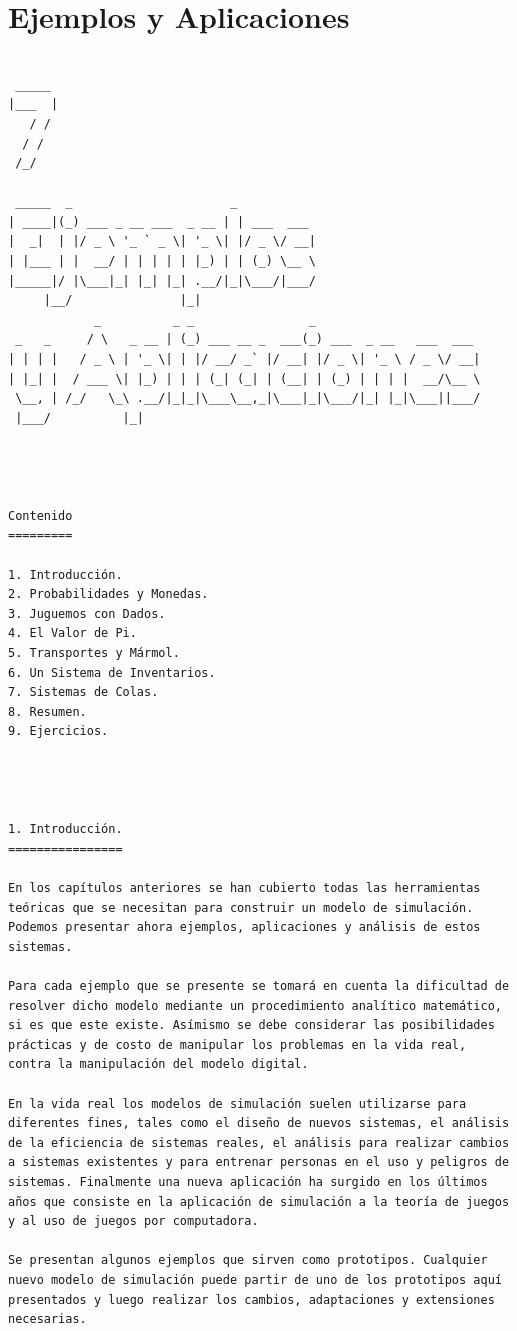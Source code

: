 
\chapter{Ejemplos y Aplicaciones}

\begin{verbatim}
    
 _____
|___  |
   / /
  / /
 /_/

 _____  _                      _
| ____|(_) ___ _ __ ___  _ __ | | ___  ___
|  _|  | |/ _ \ '_ ` _ \| '_ \| |/ _ \/ __|
| |___ | |  __/ | | | | | |_) | | (_) \__ \
|_____|/ |\___|_| |_| |_| .__/|_|\___/|___/
     |__/               |_|
            _          _ _                _
 _   _     / \   _ __ | (_) ___ __ _  ___(_) ___  _ __   ___  ___
| | | |   / _ \ | '_ \| | |/ __/ _` |/ __| |/ _ \| '_ \ / _ \/ __|
| |_| |  / ___ \| |_) | | | (_| (_| | (__| | (_) | | | |  __/\__ \
 \__, | /_/   \_\ .__/|_|_|\___\__,_|\___|_|\___/|_| |_|\___||___/
 |___/          |_|




Contenido
=========

1. Introducción.
2. Probabilidades y Monedas.
3. Juguemos con Dados.
4. El Valor de Pi.
5. Transportes y Mármol.
6. Un Sistema de Inventarios.
7. Sistemas de Colas.
8. Resumen.
9. Ejercicios.




1. Introducción.
================

En los capítulos anteriores se han cubierto todas las herramientas teóricas que se necesitan para construir un modelo de simulación. Podemos presentar ahora ejemplos, aplicaciones y análisis de estos sistemas.

Para cada ejemplo que se presente se tomará en cuenta la dificultad de resolver dicho modelo mediante un procedimiento analítico matemático, si es que este existe. Asímismo se debe considerar las posibilidades prácticas y de costo de manipular los problemas en la vida real, contra la manipulación del modelo digital.

En la vida real los modelos de simulación suelen utilizarse para diferentes fines, tales como el diseño de nuevos sistemas, el análisis de la eficiencia de sistemas reales, el análisis para realizar cambios a sistemas existentes y para entrenar personas en el uso y peligros de sistemas. Finalmente una nueva aplicación ha surgido en los últimos años que consiste en la aplicación de simulación a la teoría de juegos y al uso de juegos por computadora.

Se presentan algunos ejemplos que sirven como prototipos. Cualquier nuevo modelo de simulación puede partir de uno de los prototipos aquí presentados y luego realizar los cambios, adaptaciones y extensiones necesarias.





\end{verbatim}
